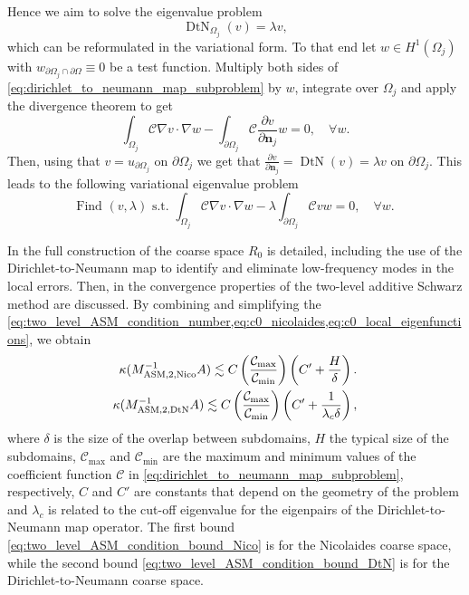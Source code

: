 Hence we aim to solve the eigenvalue problem
\[
  \operatorname{DtN}_{\Omega_j}\left(v\right) = \lambda v,
\]
which can be reformulated in the variational form. To that end let $w\in H^1(\Omega_j)$ with $w_{\partial\Omega_j\cap\partial\Omega} \equiv 0$ be a test function. Multiply both sides of \cref{eq:dirichlet_to_neumann_map_subproblem} by $w$, integrate over $\Omega_j$ and apply the divergence theorem to get
\[
  \int_{\Omega_j} \mathcal{C}\nabla v \cdot \nabla w - \int_{\partial\Omega_j} \mathcal{C}\frac{\partial v}{\partial \mathbf{n}_j}w = 0, \quad \forall w.
\]
Then, using that $v=u_{\partial\Omega_j}$ on $\partial\Omega_j$ we get that $\frac{\partial v}{\partial \mathbf{n}_j} = \operatorname{DtN}(v) = \lambda v $ on $\partial\Omega_j$. This leads to the following variational eigenvalue problem
\begin{equation}
  \text{Find } (v, \lambda) \text{ s.t. } \int_{\Omega_j} \mathcal{C}\nabla v \cdot \nabla w - \lambda \int_{\partial\Omega_j} \mathcal{C}vw = 0, \quad \forall w.
  \label{eq:dirichlet_to_neumann_map_eigenproblem}
\end{equation}

In  the full construction of the coarse space $R_0$ is detailed, including the use of the Dirichlet-to-Neumann map to identify and eliminate low-frequency modes in the local errors. Then, in  the convergence properties of the two-level additive Schwarz method are discussed. By combining and simplifying the \cref{eq:two_level_ASM_condition_number,eq:c0_nicolaides,eq:c0_local_eigenfunctions}, we obtain \cite[Theorems 5.16 and 5.17]{schwarz_methods_Dolean_2015}
\begin{subequations}
  \begin{align}
    \kappa(M^{-1}_{\text{ASM,2,\text{Nico}}}A) \lesssim C \left(\frac{\mathcal{C}_{\text{max}}}{\mathcal{C}_{\text{min}}}\right)\left(C' + \frac{H}{\delta}\right).
    \label{eq:two_level_ASM_condition_bound_Nico} \\
    \kappa(M^{-1}_{\text{ASM,2,\text{DtN}}}A) \lesssim C \left(\frac{\mathcal{C}_{\text{max}}}{\mathcal{C}_{\text{min}}}\right)\left(C' + \frac{1}{\lambda_c\delta}\right),
    \label{eq:two_level_ASM_condition_bound_DtN}
  \end{align}
\end{subequations}
where $\delta$ is the size of the overlap between subdomains, $H$ the typical size of the subdomains, $\mathcal{C}_{\text{max}}$ and $\mathcal{C}_{\text{min}}$ are the maximum and minimum values of the coefficient function $\mathcal{C}$ in \cref{eq:dirichlet_to_neumann_map_subproblem}, respectively, $C$ and $C'$ are constants that depend on the geometry of the problem and $\lambda_c$ is related to the cut-off eigenvalue for the eigenpairs of the Dirichlet-to-Neumann map operator. The first bound \cref{eq:two_level_ASM_condition_bound_Nico} is for the Nicolaides coarse space, while the second bound \cref{eq:two_level_ASM_condition_bound_DtN} is for the Dirichlet-to-Neumann coarse space.

